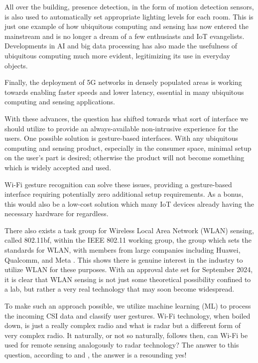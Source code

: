 All over the building, presence detection, in the form of motion detection sensors, is also used to automatically set appropriate lighting levels for each room.
This is just one example of how ubiquitous computing and sensing has now entered the mainstream and is no longer a dream of a few enthusiasts and IoT evangelists.
Developments in AI and big data processing has also made the usefulness of ubiquitous computing much more evident, legitimizing its use in everyday objects.

Finally, the deployment of 5G networks in densely populated areas is working towards enabling faster speeds and lower latency, essential in many ubiquitous computing and sensing applications.

With these advances, the question has shifted towards what sort of interface we should utilize to provide an always-available non-intrusive experience for the users.
One possible solution is gesture-based interfaces.
With any ubiquitous computing and sensing product, especially in the consumer space, minimal setup on the user's part is desired; otherwise the product will not become something which is widely accepted and used.

Wi-Fi gesture recognition can solve these issues, providing a gesture-based interface requiring potentially zero additional setup requirements.
As a bonus, this would also be a low-cost solution which many IoT devices already having the necessary hardware for regardless.

There also exists a task group for Wireless Local Area Network (WLAN) sensing, called 802.11bf, within the IEEE 802.11 working group, the group which sets the standards for WLAN, with members from large companies including Huawei, Qualcomm, and Meta \cite{du2022overview}.
This shows there is genuine interest in the industry to utilize WLAN for these purposes.
With an approval date set for September 2024, it is clear that WLAN sensing is not just some theoretical possibility confined to a lab, but rather a very real technology that may soon become widespread.

To make such an approach possible, we utilize machine learning (ML) to process the incoming CSI data and classify user gestures.
Wi-Fi technology, when boiled down, is just a really complex radio and what is radar but a different form of very complex radio.
It naturally, or not so naturally, follows then, can Wi-Fi be used for remote sensing analogously to radar technology?
The answer to this question, according to \cite{adib2013see} and \cite{chetty2011through}, the answer is a resounding yes!

